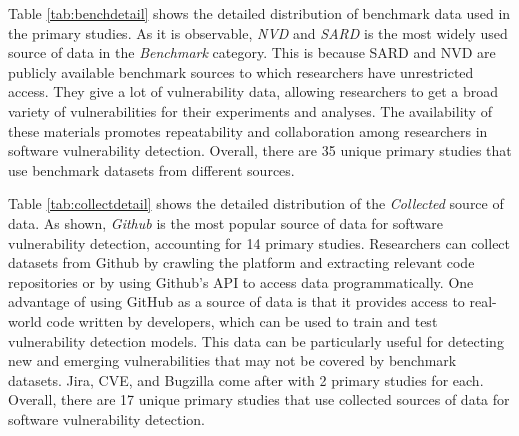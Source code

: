 
Table \ref{tab:benchdetail} shows the detailed distribution of benchmark data used in the primary studies. As it is observable, \textit{NVD} and \textit{SARD} is the most widely used source of data in the \textit{Benchmark} category. This is because SARD and NVD are publicly available benchmark sources to which researchers have unrestricted access. They give a lot of vulnerability data, allowing researchers to get a broad variety of vulnerabilities for their experiments and analyses. The availability of these materials promotes repeatability and collaboration among researchers in software vulnerability detection. Overall, there are 35 unique primary studies that use benchmark datasets from different sources. 

Table \ref{tab:collectdetail} shows the detailed distribution of the \textit{Collected} source of data. As shown, \textit{Github} is the most popular source of data for software vulnerability detection, accounting for 14 primary studies. %
Researchers can collect datasets from Github by crawling the platform and extracting relevant code repositories or by using Github's API to access data programmatically. One advantage of using GitHub as a source of data is that it provides access to real-world code written by developers, which can be used to train and test vulnerability detection models. This data can be particularly useful for detecting new and emerging vulnerabilities that may not be covered by benchmark datasets. Jira, CVE, and Bugzilla come after with 2 primary studies for each. Overall, there are 17 unique primary studies that use collected sources of data for software vulnerability detection. 




